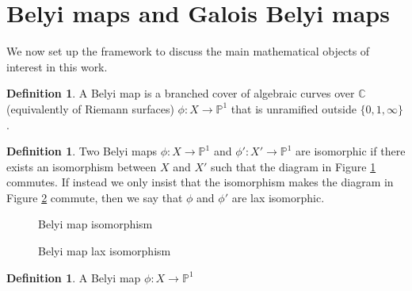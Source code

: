 \documentclass{dcthesis}
\newcommand{\PP}{\mathbb P}
\newcommand{\CC}{\mathbb C}
\newcommand{\defi}[1]{\textsf{#1}}
\theoremstyle{definition}
\newtheorem{definition}[prop]{Definition}
\theoremstyle{remark}
\numberwithin{equation}{section}
\numberwithin{figure}{section}
\begin{document}
{  \section{Belyi maps and Galois Belyi maps}{\label{sec:belyimaps}
    We now set up the framework to discuss
    the main mathematical objects of interest in this work.
    \begin{definition}\label{def:belyimap}
      A \defi{Belyi map}
      is a branched cover
      of algebraic curves over $\CC$
      (equivalently of Riemann surfaces)
      $\phi\colon X \to \PP^1$
      that is
      unramified outside
      $\{0,1,\infty\}$.
    \end{definition}
    \begin{definition}\label{def:belyiiso}
      Two Belyi maps
      $\phi\colon X\to\PP^1$ and
      $\phi'\colon X'\to\PP^1$
      are \defi{isomorphic}
      if there exists an isomorphism
      between $X$ and $X'$
      such that the diagram in Figure
      \ref{fig:belyiiso}
      commutes.
      If instead we only insist that the isomorphism
      makes the diagram in Figure
      \ref{fig:belyilax} commute,
      then we say that $\phi$ and $\phi'$
      are \defi{lax isomorphic}.
      \begin{figure}[ht]
        \begin{center}
        \end{center}
        \caption{Belyi map isomorphism}
        \label{fig:belyiiso}
      \end{figure}
      \begin{figure}[ht]
        \begin{center}
        \end{center}
        \caption{Belyi map lax isomorphism}
        \label{fig:belyilax}
      \end{figure}
    \end{definition}
    \begin{definition}\label{def:galoisbelyi}
      A Belyi map $\phi\colon X\to\PP^1$

\end{definition}}}
\end{document}
